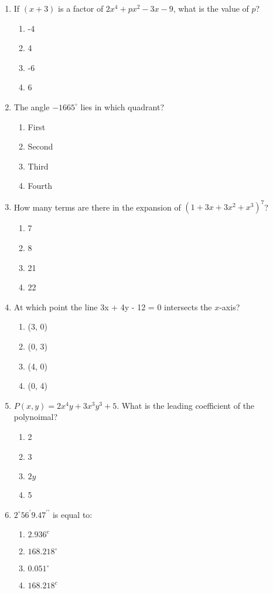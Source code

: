 \documentclass[12pt]{article}
\begin{document}
\begin{enumerate}
    \item If $(x+3)$ is a factor of $2x^4 + px^2 - 3x - 9$, what is the value of $p$?
    \begin{enumerate}
        \item -4
        \item 4
        \item -6
        \item 6
    \end{enumerate}

    \item The angle $-1665^\circ$ lies in which quadrant?
    \begin{enumerate}
        \item First
        \item Second
        \item Third
        \item Fourth
    \end{enumerate}

    \item How many terms are there in the expansion of $(1 + 3x + 3x^2 + x^3)^7$?
    \begin{enumerate}
        \item 7
        \item 8
        \item 21
        \item 22
    \end{enumerate}

    \item At which point the line 3x + 4y - 12 = 0 intersects the $x$-axis?
    \begin{enumerate}
        \item (3, 0)
        \item (0, 3)
        \item (4, 0)
        \item (0, 4)
    \end{enumerate}

    \item $P(x, y) = 2x^4y + 3x^3y^3 + 5$. What is the leading coefficient of the polynoimal?
    \begin{enumerate}
        \item 2
        \item 3
        \item $2y$
        \item 5
    \end{enumerate}

    \item $2^\circ56^\prime9.47^{\prime\prime}$ is equal to:
    \begin{enumerate}
        \item $2.936^c$
        \item $168.218^\circ$
        \item $0.051^\circ$
        \item $168.218^c$
    \end{enumerate}


\end{enumerate}
\end{document}
